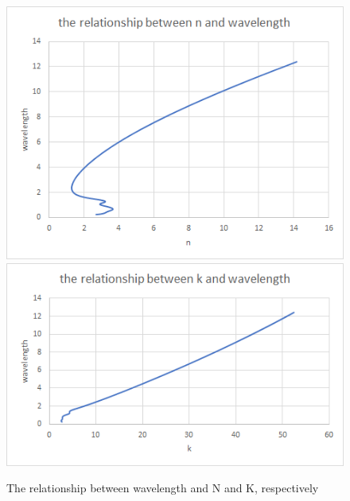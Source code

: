 \documentclass{apmcmthesis}
\begin{document}
\begin{itemize}
\begin{figure}[ht]
\centering
\includegraphics[scale=0.5]{figures/1.png}
\includegraphics[scale=0.6]{figures/2.png}
\caption{The relationship between wavelength and N and K, respectively}
\label{fig:pathdemo}
\end{figure}


\end{itemize}
\end{document}
